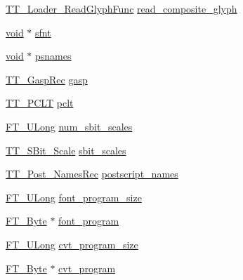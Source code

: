 \begin{DoxyCompactItemize}
\item 
\hyperlink{tttypes_8h_abf2fb3b7aa78fb7f4c4a2c2b39dae0c5}{T\-T\-\_\-\-Loader\-\_\-\-Read\-Glyph\-Func} \hyperlink{struct_t_t___face_rec___ac261cd70ce36c35c615fc5e2319b40c4}{read\-\_\-composite\-\_\-glyph}
\item 
\hyperlink{wglew_8h_aeea6e3dfae3acf232096f57d2d57f084}{void} $\ast$ \hyperlink{struct_t_t___face_rec___a4c198db893da1900ee0384969d10f9f6}{sfnt}
\item 
\hyperlink{wglew_8h_aeea6e3dfae3acf232096f57d2d57f084}{void} $\ast$ \hyperlink{struct_t_t___face_rec___a68cd8f2554793512af611422092b4814}{psnames}
\item 
\hyperlink{tttypes_8h_a88fd1c5ec597a93ed6f9ce2c9f133352}{T\-T\-\_\-\-Gasp\-Rec} \hyperlink{struct_t_t___face_rec___a042468253b53931f4901ac47e37fbe14}{gasp}
\item 
\hyperlink{tttables_8h_a92bfe9d86f9f80a56fb01ad199adc587}{T\-T\-\_\-\-P\-C\-L\-T} \hyperlink{struct_t_t___face_rec___a18faed293bc94ac00fa7612b175adc0e}{pclt}
\item 
\hyperlink{fttypes_8h_a4fac88bdba78eb76b505efa6e4fbf3f5}{F\-T\-\_\-\-U\-Long} \hyperlink{struct_t_t___face_rec___a5437fbf3ee625e001c28ec975326922a}{num\-\_\-sbit\-\_\-scales}
\item 
\hyperlink{tttypes_8h_a6433053a6a39d75f8df79cd5c8303f8a}{T\-T\-\_\-\-S\-Bit\-\_\-\-Scale} \hyperlink{struct_t_t___face_rec___a13215cb0365ee61c889385919fbd381f}{sbit\-\_\-scales}
\item 
\hyperlink{tttypes_8h_a83bbccae3ec02da01d184289466edcd9}{T\-T\-\_\-\-Post\-\_\-\-Names\-Rec} \hyperlink{struct_t_t___face_rec___a875e8db9ffdf04b9e157c801c56921d0}{postscript\-\_\-names}
\item 
\hyperlink{fttypes_8h_a4fac88bdba78eb76b505efa6e4fbf3f5}{F\-T\-\_\-\-U\-Long} \hyperlink{struct_t_t___face_rec___ae0f510b460d6af3d62ce4c6b83247a39}{font\-\_\-program\-\_\-size}
\item 
\hyperlink{fttypes_8h_a51f26183ca0c9f4af958939648caeccd}{F\-T\-\_\-\-Byte} $\ast$ \hyperlink{struct_t_t___face_rec___a74268c6131bd14019910ad63e465231d}{font\-\_\-program}
\item 
\hyperlink{fttypes_8h_a4fac88bdba78eb76b505efa6e4fbf3f5}{F\-T\-\_\-\-U\-Long} \hyperlink{struct_t_t___face_rec___aeebca91e7b062ab0d1e149fb45257a6d}{cvt\-\_\-program\-\_\-size}
\item 
\hyperlink{fttypes_8h_a51f26183ca0c9f4af958939648caeccd}{F\-T\-\_\-\-Byte} $\ast$ \hyperlink{struct_t_t___face_rec___a6644124501481504fb315ba0395caa25}{cvt\-\_\-program}

\end{DoxyCompactItemize}
